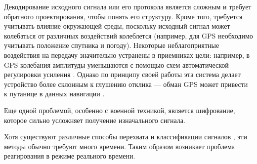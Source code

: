 Декодирование исходного сигнала или его протокола является сложным и требует обратного проектирования, чтобы понять его структуру. Кроме того, требуется учитывать влияние окружающей среды, поскольку исходный сигнал может колебаться от различных воздействий колеблется (например, для GPS необходимо учитывать положение спутника и погоду). Некоторые неблагоприятные воздействия на передачу значительно устранены в приемниках цели: например, в GPS колебания амплитуды уменьшаются с помощью схем автоматической регулировки усиления \cite{autogaincontrol}. Однако по принципу своей работы эта система делает устройство более склонным к глушению отклика --- обман GPS может привести к путанице в данных навигации \cite{gpsspoofing}.

Еще одной проблемой, особенно с военной техникой, является шифрование, которое сильно усложняет получение изначального сигнала.

Хотя существуют различные способы перехвата и классификации сигналов \cite{analisanddecod}, эти методы обычно требуют много времени. Таким образом возникает проблема реагирования в режиме реального времени.